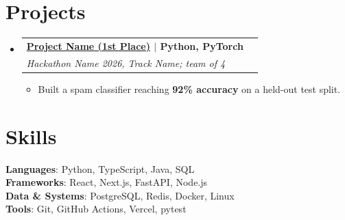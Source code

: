 \documentclass[letterpaper,11pt]{article}
\makeatletter
\newcommand{\resumeItem}[1]{\item\small{{#1 \vspace{-2pt}}}}
\newcommand{\resumeSubheading}[4]{
  \vspace{-2pt}\item
    \begin{tabular*}{0.97\textwidth}[t]{l@{\extracolsep{\fill}}r}
      \textbf{#1} & #2 \\
      \textit{\small#3} & \textit{\small #4} \\
    \end{tabular*}\vspace{-7pt}
}
\newcommand{\resumeSubHeadingListStart}{\begin{itemize}[leftmargin=0.15in, label={}]}
\newcommand{\resumeSubHeadingListEnd}{\end{itemize}}
\newcommand{\resumeItemListStart}{\begin{itemize}}
\newcommand{\resumeItemListEnd}{\end{itemize}\vspace{-5pt}}
\makeatother
\begin{document}
\section{Projects}
\resumeSubHeadingListStart
  \resumeSubheading
    {\href{https://github.com/you/project}{Project Name (1st Place)} $|$ \textnormal{\small Python, PyTorch}}{}
    {Hackathon Name 2026, Track Name; team of 4}{}
  \resumeItemListStart
    \resumeItem{Built a spam classifier reaching \textbf{92\% accuracy} on a held-out test split.}
  \resumeItemListEnd
\resumeSubHeadingListEnd

\section{Skills}
\begin{itemize}[leftmargin=0.15in, label={}]
  \small{\item{
    \textbf{Languages}{: Python, TypeScript, Java, SQL} \\
    \textbf{Frameworks}{: React, Next.js, FastAPI, Node.js} \\
    \textbf{Data \& Systems}{: PostgreSQL, Redis, Docker, Linux} \\
    \textbf{Tools}{: Git, GitHub Actions, Vercel, pytest}
  }}
\end{itemize}
\end{document}
